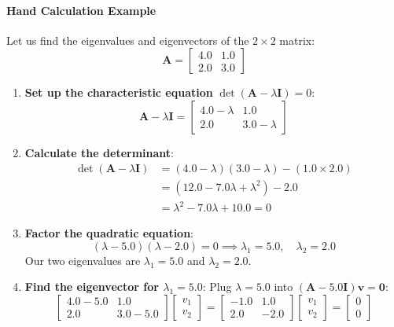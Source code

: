 \paragraph{Hand Calculation Example}
Let us find the eigenvalues and eigenvectors of the $2 \times 2$ matrix:
\begin{equation*}
\mathbf{A} = \begin{bmatrix} 4.0 & 1.0 \\ 2.0 & 3.0 \end{bmatrix}
\end{equation*}
\begin{enumerate}
    \item \textbf{Set up the characteristic equation} $\det(\mathbf{A} - \lambda \mathbf{I}) = 0$:
    \begin{equation*}
    \mathbf{A} - \lambda \mathbf{I} = \begin{bmatrix} 4.0 - \lambda & 1.0 \\ 2.0 & 3.0 - \lambda \end{bmatrix}
    \end{equation*}
    \item \textbf{Calculate the determinant}:
    \begin{align*}
    \det(\mathbf{A} - \lambda \mathbf{I}) &= (4.0 - \lambda)(3.0 - \lambda) - (1.0 \times 2.0) \\
    &= (12.0 - 7.0\lambda + \lambda^2) - 2.0 \\
    &= \lambda^2 - 7.0\lambda + 10.0 = 0
    \end{align*}
    \item \textbf{Factor the quadratic equation}:
    \begin{equation*}
    (\lambda - 5.0)(\lambda - 2.0) = 0 \implies \lambda_1 = 5.0, \quad \lambda_2 = 2.0
    \end{equation*}
    Our two eigenvalues are $\lambda_1 = 5.0$ and $\lambda_2 = 2.0$.
    \item \textbf{Find the eigenvector for $\lambda_1 = 5.0$}:
    Plug $\lambda = 5.0$ into $(\mathbf{A} - 5.0\mathbf{I})\mathbf{v} = \mathbf{0}$:
    \begin{equation*}
    \begin{bmatrix} 4.0 - 5.0 & 1.0 \\ 2.0 & 3.0 - 5.0 \end{bmatrix} \begin{bmatrix} v_1 \\ v_2 \end{bmatrix} = \begin{bmatrix} -1.0 & 1.0 \\ 2.0 & -2.0 \end{bmatrix} \begin{bmatrix} v_1 \\ v_2 \end{bmatrix} = \begin{bmatrix} 0 \\ 0 \end{bmatrix}

\end{equation*}
\end{enumerate}
